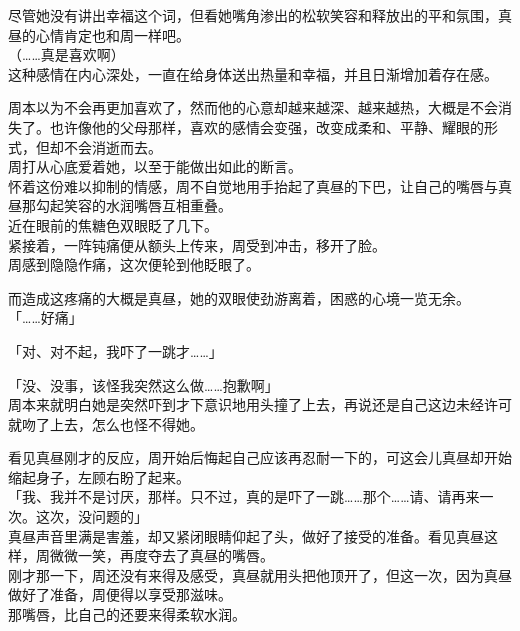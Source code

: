 尽管她没有讲出幸福这个词，但看她嘴角渗出的松软笑容和释放出的平和氛围，真昼的心情肯定也和周一样吧。\\

（……真是喜欢啊）\\

这种感情在内心深处，一直在给身体送出热量和幸福，并且日渐增加着存在感。

周本以为不会再更加喜欢了，然而他的心意却越来越深、越来越热，大概是不会消失了。也许像他的父母那样，喜欢的感情会变强，改变成柔和、平静、耀眼的形式，但却不会消逝而去。\\

周打从心底爱着她，以至于能做出如此的断言。\\

怀着这份难以抑制的情感，周不自觉地用手抬起了真昼的下巴，让自己的嘴唇与真昼那勾起笑容的水润嘴唇互相重叠。\\

近在眼前的焦糖色双眼眨了几下。\\

紧接着，一阵钝痛便从额头上传来，周受到冲击，移开了脸。\\

周感到隐隐作痛，这次便轮到他眨眼了。

而造成这疼痛的大概是真昼，她的双眼使劲游离着，困惑的心境一览无余。\\

「……好痛」

「对、对不起，我吓了一跳才……」

「没、没事，该怪我突然这么做……抱歉啊」\\

周本来就明白她是突然吓到才下意识地用头撞了上去，再说还是自己这边未经许可就吻了上去，怎么也怪不得她。

看见真昼刚才的反应，周开始后悔起自己应该再忍耐一下的，可这会儿真昼却开始缩起身子，左顾右盼了起来。\\

「我、我并不是讨厌，那样。只不过，真的是吓了一跳……那个……请、请再来一次。这次，没问题的」\\

真昼声音里满是害羞，却又紧闭眼睛仰起了头，做好了接受的准备。看见真昼这样，周微微一笑，再度夺去了真昼的嘴唇。\\

刚才那一下，周还没有来得及感受，真昼就用头把他顶开了，但这一次，因为真昼做好了准备，周便得以享受那滋味。\\

那嘴唇，比自己的还要来得柔软水润。

